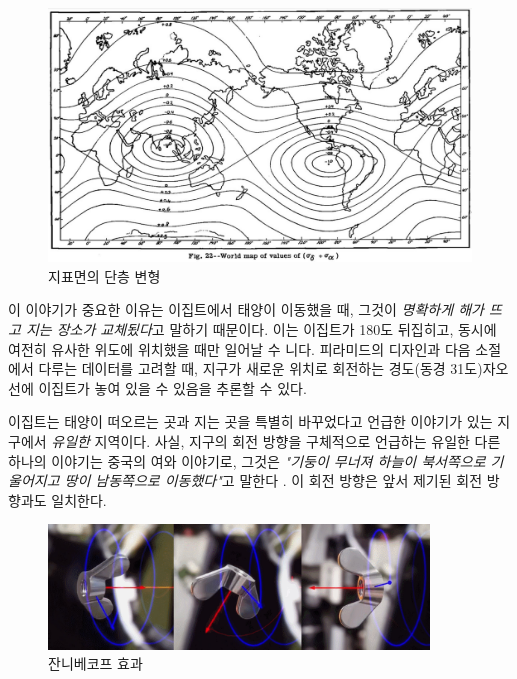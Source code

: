 \documentclass[10pt,twocolumn,letterpaper]{article}
\begin{document}
\begin{figure}[t]
\begin{center}
   \includegraphics[width=1\linewidth]{meinesz3.jpg}
\end{center}
   \caption{지표면의 단층 변형  \cite{36}}
\label{fig:8}
\label{fig:onecol}
\end{figure}


이 이야기가 중요한 이유는 이집트에서 태양이 이동했을 때, 그것이 \textit{ 명확하게 해가 뜨고 지는 장소가 교체됬다}고 말하기 때문이다. 이는 이집트가 180도 뒤집히고, 동시에 여전히 유사한 위도에 위치했을 때만 일어날 수 니다. 피라미드의 디자인과 다음 소절에서 다루는 데이터를 고려할 때, 지구가 새로운 위치로 회전하는 경도(동경 31도)자오선에 이집트가  놓여 있을 수 있음을 추론할 수 있다.

이집트는 태양이 떠오르는 곳과 지는 곳을 특별히 바꾸었다고 언급한 이야기가 있는 지구에서 \textit{유일한} 지역이다. 사실, 지구의 회전 방향을 구체적으로 언급하는 유일한 다른 하나의 이야기는 중국의 여와 이야기로, 그것은 \textit{"기둥이 무너져 하늘이 북서쪽으로 기울어지고 땅이 남동쪽으로 이동했다"}고 말한다 \cite{8}. 이 회전 방향은 앞서 제기된 회전 방향과도 일치한다.


\begin{figure}[t]
\begin{center}
\includegraphics[width=0.9\textwidth]{dzhani.jpg}
\end{center}
   \caption{잔니베코프 효과  \cite{28}}
\label{fig:10}
\end{figure}
\end{document}
